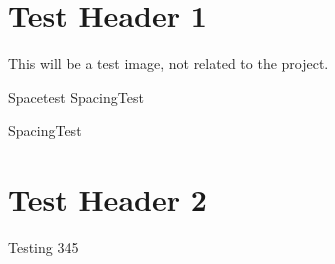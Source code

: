 \hypertarget{Dev_sec3}{}\section{Test Header 1}\label{Dev_sec3}
This will be a test image, not related to the project.

 Spacetest  Spacing\+Test

Spacing\+Test \hypertarget{Dev_sec4}{}\section{Test Header 2}\label{Dev_sec4}
Testing 345 